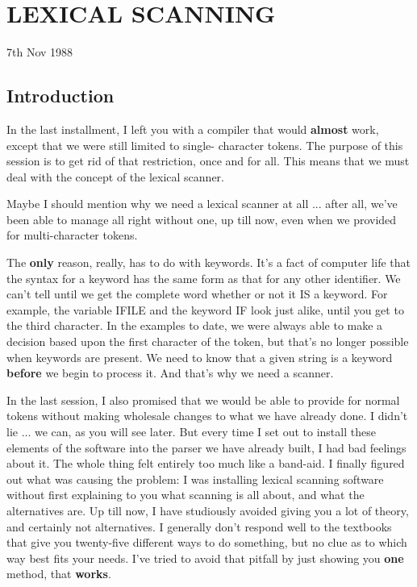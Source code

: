 
\chapter{LEXICAL SCANNING}

7th Nov 1988

\section{Introduction}

In the last installment, I left you with a  compiler  that  would {\bfseries almost}  work, except  that  we  were  still  limited to  single- character tokens. The purpose of  this  session is to get rid of that restriction, once and for all. This means that we must deal with the concept of the lexical scanner.

Maybe I should mention why we  need  a lexical scanner at all ... after all, we've been able to manage all right  without  one, up till now, even when we provided for multi-character tokens.

The {\bfseries only} reason, really, has to do with keywords. It's a fact of computer life that the syntax for a keyword has the same  form as that  for  any  other identifier. We can't tell until we get the complete word whether or not it  IS  a keyword. For example, the variable IFILE and the keyword IF look just alike, until  you get to the third character. In the examples to date, we  were always able to make  a  decision  based  upon the first character of the token, but that's  no  longer possible when keywords are present. We  need to know that a given string is a keyword {\bfseries before} we begin to process it. And that's why we need a scanner.

In the last session, I also promised that  we  would  be  able to provide for normal tokens  without  making  wholesale  changes to what we have  already done. I didn't lie ... we can, as you will see later. But every time I set out to install these elements of the software into  the  parser  we  have already built, I had bad feelings about it. The whole thing felt entirely too much like a band-aid. I finally figured out what was causing the  problem: I was installing lexical scanning software without first explaining to you what scanning is all about, and what the alternatives are. Up  till  now, I have studiously avoided  giving  you  a  lot  of theory, and  certainly  not  alternatives. I  generally don't respond well to the textbooks that give you twenty-five different ways  to do something, but no clue as to which way best fits your needs. I've tried to avoid that pitfall by just showing  you {\bfseries one} method, that {\bfseries works}.

